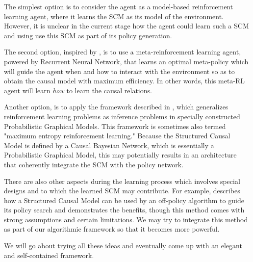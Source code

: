 \documentclass{article}
\begin{document}
The simplest option is to consider the agent as a model-based reinforcement learning agent, where it learns the SCM as its model of the environment. However, it is unclear in the current stage how the agent could learn such a SCM and using use this SCM as part of its policy generation. 

The second option, inspired by \cite{2019arXiv190108162D}, is to use a meta-reinforcement learning agent, powered by Recurrent Neural Network, that learns an optimal meta-policy which will guide the agent when and how to interact with the environment so as to obtain the causal model with maximum efficiency. In other words, this meta-RL agent will learn \textit{how} to learn the causal relations. 

Another option, is to apply the framework described in \cite{DBLP:journals/corr/abs-1805-00909}, which generalizes reinforcement learning problems as inference problems in specially constructed Probabilistic Graphical Models. This framework is sometimes also termed "maximum entropy reinforcement learning." Because the Structured Causal Model is defined by a Causal Bayesian Network, which is essentially a Probabilistic Graphical Model, this may potentially results in an architecture that coherently integrate the SCM with the policy network. 

There are also other aspects during the learning process which involves special designs and to which the learned SCM may contribute. For example, \cite{buesing2018woulda} describes how a Structured Causal Model can be used by an off-policy algorithm to guide its policy search and demonstrates the benefits, though this method comes with strong assumptions and certain limitations. We may try to integrate this method as part of our algorithmic framework so that it becomes more powerful. 

We will go about trying all these ideas and eventually come up with an elegant and self-contained framework.
\end{document}

